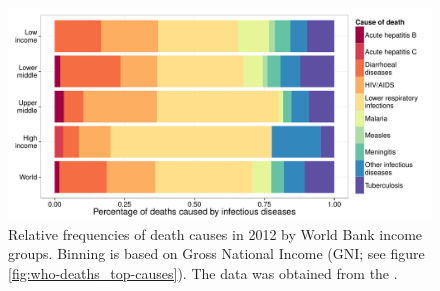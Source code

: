 \begin{knitrout}
\color{fgcolor}\begin{figure}
\includegraphics[width=\maxwidth]{figures/R/who-deaths/byDisease-who-deaths_by-disease-1} \caption{Relative frequencies of death causes in 2012 by World Bank income groups. Binning is based on Gross National Income (GNI; see figure \ref{fig:who-deaths_top-causes}). The data was obtained from the \cite{WHO2012}.}\label{fig:who-deaths_by-disease}
\end{figure}


\end{knitrout}

\newcommand{\knitrPercentageInfectTwelveWorldLRI}{34.5\%}
\newcommand{\knitrPercentageInfectTwelveHighLRI}{57.7\%}
\newcommand{\knitrPercentageInfectTwelveUmidLRI}{43.5\%}
\newcommand{\knitrPercentageInfectTwelveLmidLRI}{30.8\%}
\newcommand{\knitrPercentageInfectTwelveLowLRI}{28.7\%}
\newcommand{\knitrPercentageInfectTwelveHighDiarr}{5.6\%}
\newcommand{\knitrPercentageInfectTwelveUmidDiarr}{7\%}
\newcommand{\knitrPercentageInfectTwelveLmidDiarr}{21.4\%}
\newcommand{\knitrPercentageInfectTwelveLowDiarr}{16.6\%}
\newcommand{\knitrPercentageInfectTwelveWorldAIDS}{17.3\%}
\newcommand{\knitrPercentageInfectTwelveWorldDiarr}{16.9\%}
\newcommand{\knitrPercentageInfectTwelveHighAIDS}{11.3\%}
\newcommand{\knitrPercentageInfectTwelveUmidAIDS}{26.2\%}
\newcommand{\knitrPercentageInfectTwelveLmidAIDS}{13.3\%}
\newcommand{\knitrPercentageInfectTwelveLowAIDS}{20.4\%}
